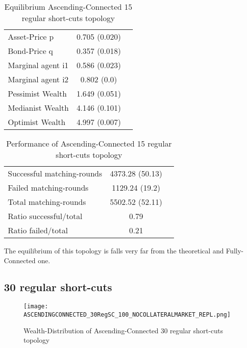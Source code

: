 \documentclass[Bachelorarbeit.tex]{subfiles}
\begin{document}
\begin{table}[H]
	\caption{Equilibrium Ascending-Connected 15 regular short-cuts topology}
	\centering
	\begin{tabular} { l c r }
		\hline
		Asset-Price p & 0.705 (0.020) \\
		Bond-Price q & 0.357 (0.018) \\
		Marginal agent i1 & 0.586 (0.023) \\
		Marginal agent i2 & 0.802 (0.0) \\
		\hline
		Pessimist Wealth & 1.649 (0.051) \\
		Medianist Wealth & 4.146 (0.101) \\
		Optimist Wealth & 4.997 (0.007) \\
		\hline
	\end{tabular}
\end{table} 

\begin{table}[H]
	\caption{Performance of Ascending-Connected 15 regular short-cuts topology}
	\centering
	\begin{tabular} { l c r }
		\hline
		Successful matching-rounds& 4373.28 (50.13) \\
		Failed matching-rounds & 1129.24 (19.2) \\
		Total matching-rounds & 5502.52 (52.11) \\
		\hline
		Ratio successful/total & 0.79 \\
		Ratio failed/total & 0.21 \\
		\hline
	\end{tabular}
\end{table}

The equilibrium of this topology is falls very far from the theoretical and Fully-Connected one.

\subsection{30 regular short-cuts}
\begin{figure}[H]
	\centering
  \texttt{[image: ASCENDINGCONNECTED\_30RegSC\_100\_NOCOLLATERALMARKET\_REPL.png]}
	\caption{Wealth-Distribution of Ascending-Connected 30 regular short-cuts topology}
	\label{fig:wealth_ASCENDINGCONNECTED_30RegSC_100_NOCOLLATERALMARKET_REPL}
\end{figure}
\end{document}
